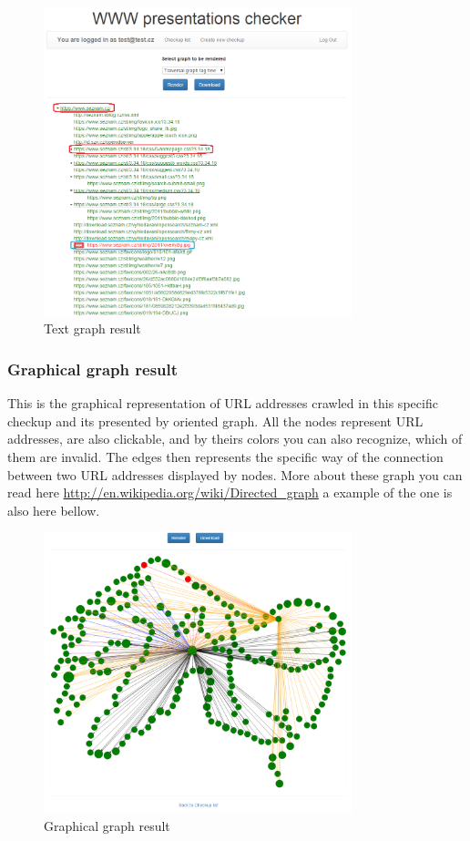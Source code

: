 \documentclass[12pt,a4paper]{article}
\begin{document}
\begin{figure}[H]
    \centering
    \includegraphics[width=0.8\textwidth]{pictures/text.png}
		\caption{Text graph result}
		\label{fig:text}
\end{figure}

\subsubsection{Graphical graph result} \label{graphical}
This is the graphical representation of URL addresses crawled in this specific checkup and its presented by oriented graph. All the nodes represent URL addresses, are also clickable, and by theirs colors you can also recognize, which of them are invalid. The edges then represents the specific way of the connection between two URL addresses displayed by nodes. More about these graph you can read here \url{http://en.wikipedia.org/wiki/Directed_graph} a example of the one is also here bellow.

\begin{figure}[H]
    \centering
    \includegraphics[width=0.8\textwidth]{pictures/graphical.png}
		\caption{Graphical graph result}
		\label{fig:graphical}
\end{figure}
\end{document}
